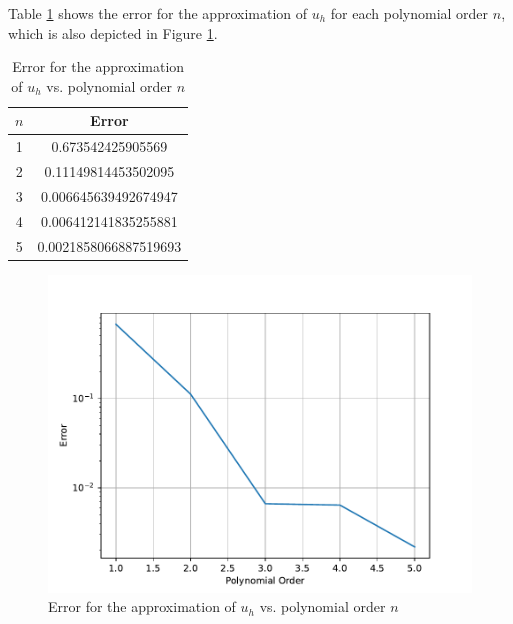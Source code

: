 Table \ref{tab:error_vs_n} shows the error for the approximation of $u_h$ for each polynomial order $n$, which is also depicted in Figure \ref{fig:error_vs_n}.
\begin{table}
    \centering
    \caption{Error for the approximation of $u_h$ vs. polynomial order $n$}
    \begin{tabular}{cc}
        \toprule
        $n$ & Error \\
        \midrule
        1 & 0.673542425905569 \\
        2 & 0.11149814453502095 \\
        3 & 0.006645639492674947 \\
        4 & 0.006412141835255881 \\
        5 & 0.0021858066887519693 \\
        \bottomrule
    \end{tabular}
    \label{tab:error_vs_n}
\end{table}
\begin{figure}[htb!]
    \centering
    \includegraphics[scale=.9]{Figures/Error_2.pdf}
    \caption{Error for the approximation of $u_h$ vs. polynomial order $n$}
    \label{fig:error_vs_n}
\end{figure}

